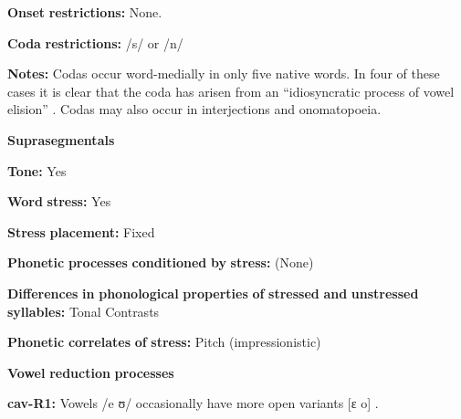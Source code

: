 \begin{styleBody}
\textbf{Onset} \textbf{restrictions:} None.
\end{styleBody}

\begin{styleBody}
\textbf{Coda} \textbf{restrictions:} /s/ or /n/
\end{styleBody}

\begin{styleBody}
\textbf{Notes:} Codas occur word-medially in only five native words. In four of these cases it is clear that the coda has arisen from an “idiosyncratic process of vowel elision” \citep[31]{Guillaume2008}. Codas may also occur in interjections and onomatopoeia.
\end{styleBody}

\begin{styleBody}
\textbf{Suprasegmentals}
\end{styleBody}

\begin{styleBody}
\textbf{Tone:} Yes
\end{styleBody}

\begin{styleBody}
\textbf{Word} \textbf{stress:} Yes
\end{styleBody}

\begin{styleBody}
\textbf{Stress} \textbf{placement:} Fixed
\end{styleBody}

\begin{styleBody}
\textbf{Phonetic} \textbf{processes} \textbf{conditioned} \textbf{by} \textbf{stress:} (None)
\end{styleBody}

\begin{styleBody}
\textbf{Differences} \textbf{in} \textbf{phonological} \textbf{properties} \textbf{of} \textbf{stressed} \textbf{and} \textbf{unstressed} \textbf{syllables:} Tonal Contrasts
\end{styleBody}

\begin{styleBody}
\textbf{Phonetic} \textbf{correlates} \textbf{of} \textbf{stress:} Pitch (impressionistic)
\end{styleBody}

\begin{styleBody}
\textbf{Vowel} \textbf{reduction} \textbf{processes}
\end{styleBody}

\begin{styleBody}
\textbf{cav-R1:} Vowels /e ʊ/ occasionally have more open variants [ɛ o] \citep[29]{Guillaume2008}.
\end{styleBody}

